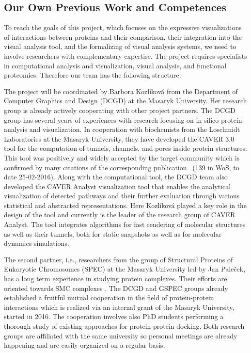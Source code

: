 \documentclass[11pt,a4paper,titlepage,oneside,onecolumn]{article}
\begin{document}
\subsection{Our Own Previous Work and Competences}
To reach the goals of this project, which focuses on the expressive visualizations of interactions between proteins and their comparison, their integration into the visual analysis tool, and the formalizing of visual analysis systems, we need to involve researchers with complementary expertise.
The project requires specialists in computational analysis and visualization, visual analysis, and functional proteomics.
Therefore our team has the following structure.

The project will be coordinated by Barbora Kozl\'{i}kov\'{a} from the Department of Computer Graphics and Design (DCGD) at the Masaryk University.
Her research group is already actively cooperating with other project partners. 
The DCGD group has several years of experiences with research focusing on in-silico protein analysis and visualization.
In cooperation with biochemists from the Loschmidt Laboratories at the Masaryk University, they have developed the CAVER 3.0~\cite{caver} tool for the computation of tunnels, channels, and pores inside protein structures. 
This tool was positively and widely accepted by the target community which is confirmed by many citations of the corresponding publication~\cite{caver} (139 in WoS, to date 25-02-2016).
Along with the computational tool, the DCGD team also developed the CAVER Analyst visualization tool \cite{analyst} that enables the analytical visualization of detected pathways and their further evaluation through various statistical and abstracted representations. 
Here Kozl\'{i}kov\'{a} played a key role in the design of the tool and currently is the leader of the research group of CAVER Analyst. 
The tool integrates algorithms for fast rendering of molecular structures as well as their tunnels, both for static snapshots as well as for molecular dynamics simulations. 

The second partner, i.e., researchers from the group of Structural Proteins of Eukaryotic Chromosomes (SPEC) at the Masaryk University led by Jan Pale\v{c}ek, has a long term experience in studying protein complexes. 
Their efforts are oriented towards SMC complexes \cite{guerineau,hudson,Palecek2015}.
The DCGD and GSPEC groups already established a fruitful mutual cooperation in the field of protein-protein interactions which is realized via an internal grant of the Masaryk University, started in 2016.
The cooperation involves also PhD students performing a thorough study of existing approaches for protein-protein docking.
Both research groups are affiliated with the same university so personal meetings are already happening and are easily organized on a regular basis.
 
\end{document}
